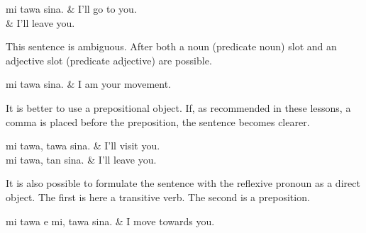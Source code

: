 \begin{translationtable}
    mi tawa sina. & I'll go to you. \\
                  & I'll leave you. \\
\end{translationtable}
%
This sentence is ambiguous.
After  both a noun (predicate noun) slot and an adjective slot (predicate adjective) are possible.

\begin{translationtable}
    mi tawa sina. & I am your movement. \\
\end{translationtable}
%
It is better to use a prepositional object.
If, as recommended in these lessons, a comma is placed before the preposition, the sentence becomes clearer.

\begin{translationtable}
    mi tawa, tawa sina. & I'll visit you. \\
    mi tawa, tan sina.  & I'll leave you. \\
\end{translationtable}
%
It is also possible to formulate the sentence with the reflexive pronoun  as a direct object.
The first  is here a transitive verb.
The second  is a preposition.

\begin{translationtable}
    mi tawa e mi, tawa sina. & I move towards you. \\
\end{translationtable}


